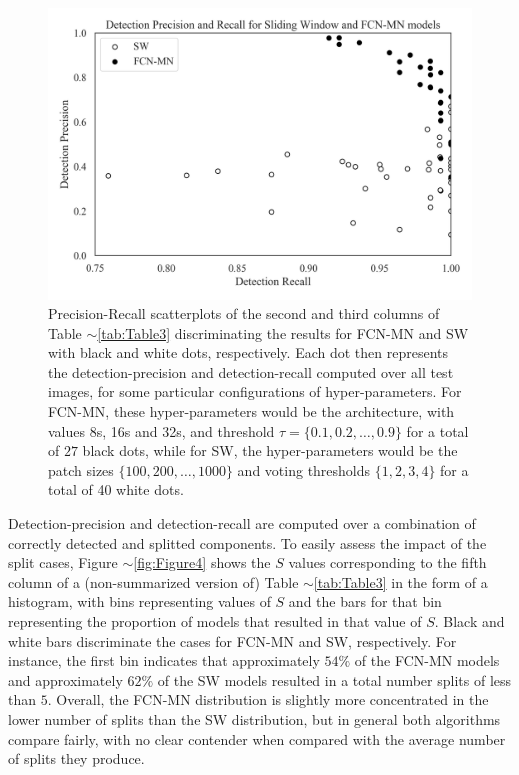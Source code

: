 \documentclass[a4paper,authoryear,review]{elsarticle}
\begin{document}
	
	\begin{figure}
		\centering
		\includegraphics[width=\textwidth]{figures/111_precision_recall_detection.png}
		\caption{
			Precision-Recall scatterplots of the second and third columns of Table $\sim$\ref{tab:Table3} discriminating the results for FCN-MN and SW with black and white dots, respectively. Each dot then represents the detection-precision and detection-recall computed over all test images, for some particular configurations of hyper-parameters. For FCN-MN, these hyper-parameters would be the architecture, with values 8s, 16s and 32s, and threshold $\tau = \{0.1, 0.2, \ldots, 0.9\}$  for a total of $27$ black dots, while for SW, the hyper-parameters would be the patch sizes  $\{100, 200, \ldots, 1000\}$ and voting thresholds $\{1, 2, 3, 4\}$ for a total of 40 white dots.
		}
		\label{fig:Figure3}
	\end{figure}
	
	
	Detection-precision and detection-recall are computed over a combination of correctly detected and splitted components. To easily assess the impact of the split cases, Figure $\sim$\ref{fig:Figure4} shows the $S$ values corresponding to the fifth column of a   (non-summarized version of) Table $\sim$\ref{tab:Table3} in the form of a histogram, with bins representing values of $S$ and the bars for that bin representing the proportion of models that resulted in that value of $S$. Black and white bars discriminate the cases for FCN-MN and SW, respectively. For instance, the first bin indicates that approximately $54\%$ of the FCN-MN models and approximately $62\%$ of the SW models resulted in a total number splits of less than $5$. Overall, the FCN-MN distribution is slightly more concentrated in the lower number of splits than the SW distribution, but in general both algorithms compare fairly, with no clear contender when compared with the average number of splits they produce. 
	
\end{document}
